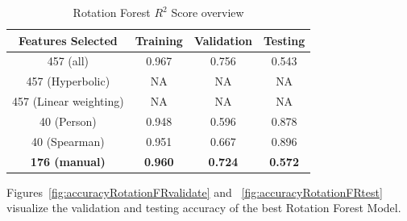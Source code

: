 \documentclass[11pt]{article}
\begin{document}
\begin{table} [h!]
\centering
 \begin{tabular}{ | c | c | c | c | }
\hline
\textbf{Features Selected} & \textbf{Training} & \textbf{Validation} & \textbf{Testing} \\ [0.5 ex]
\hline \hline
457 (all) & 0.967 & 0.756 & 0.543\\
457 (Hyperbolic) & NA & NA & NA\\
457 (Linear weighting) & NA & NA & NA\\
40 (Person) & 0.948 & 0.596 & 0.878\\
40 (Spearman) & 0.951 & 0.667 &0.896 \\
\textbf{176 (manual)} & \textbf{0.960} & \textbf{0.724} & \textbf{0.572} \\ [1ex]
\hline
\end{tabular}
\caption{Rotation Forest $R^2$ Score overview}
\label {table:4}
\end{table}

Figures~\ref{fig:accuracyRotationFRvalidate} and ~\ref{fig:accuracyRotationFRtest} visualize the validation and testing accuracy of the best Rotation Forest Model.
\end{document}
